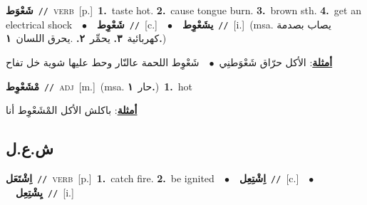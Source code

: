 \documentclass[10pt,a4paper,twoside]{article} %
\begin{document}
\begin{multicols}{2}
{\setlength\topsep{0pt}\textbf{\foreignlanguage{arabic}{شَعْوَط}}\ {\color{gray}\texttt{//}\color{black}}\ \textsc{verb}\ [p.]\ \textbf{1.}~taste hot.  \textbf{2.}~cause tongue burn.  \textbf{3.}~brown sth.  \textbf{4.}~get an electrical shock\ \ $\bullet$\ \ \setlength\topsep{0pt}\textbf{\foreignlanguage{arabic}{شَعْوِط}}\ {\color{gray}\texttt{//}\color{black}}\ [c.]\ \ $\bullet$\ \ \setlength\topsep{0pt}\textbf{\foreignlanguage{arabic}{يشَعْوِط}}\ {\color{gray}\texttt{//}\color{black}}\ [i.]\ \color{gray}(msa. \foreignlanguage{arabic}{يصاب بصدمة كهربائية}~\foreignlanguage{arabic}{\textbf{٣.}}  \foreignlanguage{arabic}{يحمِّر}~\foreignlanguage{arabic}{\textbf{٢.}}  .\foreignlanguage{arabic}{يحرق اللسان}~\foreignlanguage{arabic}{\textbf{١.}})\color{black}\  \begin{flushright}\color{gray}\foreignlanguage{arabic}{\textbf{\underline{\foreignlanguage{arabic}{أمثلة}}}: الأكل حرّاق شَعْوَطنِي\ $\bullet$\ \  شَعْوِط اللحمة عالنّار وحط عليها شوية خل تفاح}\end{flushright}\color{black}} \vspace{2mm}

{\setlength\topsep{0pt}\textbf{\foreignlanguage{arabic}{مْشَعْوِط}}\ {\color{gray}\texttt{//}\color{black}}\ \textsc{adj}\ [m.]\ \color{gray}(msa. \foreignlanguage{arabic}{حار}~\foreignlanguage{arabic}{\textbf{١.}})\color{black}\ \textbf{1.}~hot\  \begin{flushright}\color{gray}\foreignlanguage{arabic}{\textbf{\underline{\foreignlanguage{arabic}{أمثلة}}}: باكلش الأكل المْشَعْوِط أنا}\end{flushright}\color{black}} \vspace{2mm}

\vspace{-3mm}
\subsection*{\color{blue}\foreignlanguage{arabic}{ش.ع.ل}\color{blue}{}} 

{\setlength\topsep{0pt}\textbf{\foreignlanguage{arabic}{اِشْتَعَل}}\ {\color{gray}\texttt{//}\color{black}}\ \textsc{verb}\ [p.]\ \textbf{1.}~catch fire.  \textbf{2.}~be ignited\ \ $\bullet$\ \ \setlength\topsep{0pt}\textbf{\foreignlanguage{arabic}{اِشْتِعِل}}\ {\color{gray}\texttt{//}\color{black}}\ [c.]\ \ $\bullet$\ \ \setlength\topsep{0pt}\textbf{\foreignlanguage{arabic}{يِشْتِعِل}}\ {\color{gray}\texttt{//}\color{black}}\ [i.]\ } \vspace{2mm}


\end{multicols}
\end{document}
